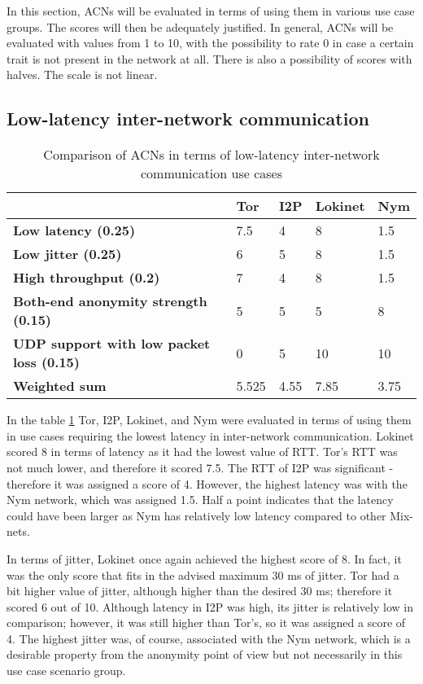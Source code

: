 In this section, ACNs will be evaluated in terms of using them in various use case groups. The scores will then be adequately justified. In general, ACNs will be evaluated with values from 1 to 10, with the possibility to rate 0 in case a certain trait is not present in the network at all. There is also a possibility of scores with halves. The scale is not linear.

\subsection{Low-latency inter-network communication}

\begin{table}[!ht]
\caption{Comparison of ACNs in terms of low-latency inter-network communication use cases}
\label{tab:low_latency_uc}
\small
\begin{tabular}{|p{}|p{}|p{}|p{}|p{}|}
\hline
\textbf{} & \textbf{Tor} & \textbf{I2P} & \textbf{Lokinet} & \textbf{Nym} \\
\hline
\textbf{Low latency (0.25)} & 7.5 & 4 & 8 & 1.5 \\
\hline
\textbf{Low jitter (0.25)} & 6 & 5 & 8 & 1.5 \\
\hline
\textbf{High throughput (0.2)} & 7 & 4 & 8 & 1.5 \\
\hline
\textbf{Both-end anonymity strength (0.15)} & 5 & 5 & 5 & 8 \\
\hline
\textbf{UDP support with low packet loss (0.15)} & 0 & 5 & 10 & 10 \\
\hline
\textbf{Weighted sum} & 5.525 & 4.55 & 7.85 & 3.75 \\
\hline
\end{tabular}
\end{table}

In the table \ref{tab:low_latency_uc} Tor, I2P, Lokinet, and Nym were evaluated in terms of using them in use cases requiring the lowest latency in inter-network communication. Lokinet scored 8 in terms of latency as it had the lowest value of RTT. Tor's RTT was not much lower, and therefore it scored 7.5. The RTT of I2P was significant - therefore it was assigned a score of 4. However, the highest latency was with the Nym network, which was assigned 1.5. Half a point indicates that the latency could have been larger as Nym has relatively low latency compared to other Mix-nets.

In terms of jitter, Lokinet once again achieved the highest score of 8. In fact, it was the only score that fits in the advised maximum 30 ms of jitter. Tor had a bit higher value of jitter, although higher than the desired 30 ms; therefore it scored 6 out of 10. Although latency in I2P was high, its jitter is relatively low in comparison; however, it was still higher than Tor's, so it was assigned a score of 4. The highest jitter was, of course, associated with the Nym network, which is a desirable property from the anonymity point of view but not necessarily in this use case scenario group.

